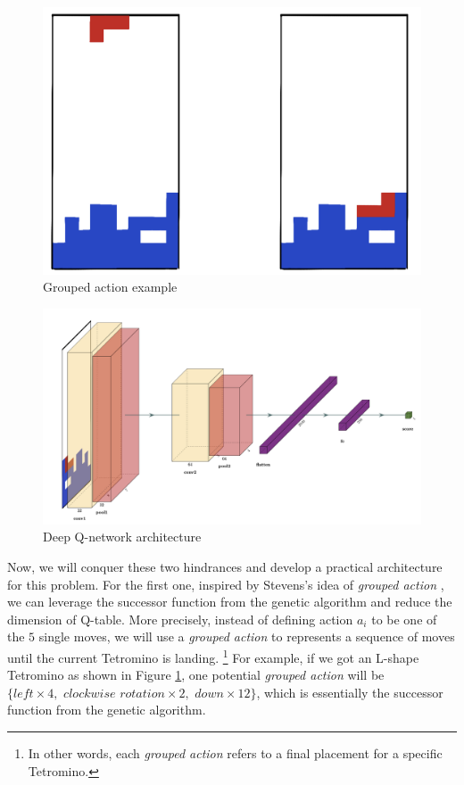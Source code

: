 \documentclass[letterpaper]{article} %
\begin{document}
\begin{figure}
  \centering
  \includegraphics[width=0.9\linewidth]{figures/group_actions.jpeg}
  \caption{Grouped action example}
  \label{fig:grouped_action}
\end{figure}


\begin{figure}[h]
  \centering
  \includegraphics[width=0.85\linewidth]{figures/DQN.png}
  \caption{Deep Q-network architecture}
  \label{fig:DQN}
\end{figure}

Now, we will conquer these two hindrances and develop a practical architecture for this problem. For the first one, inspired by Stevens's idea of \textit{grouped action} \cite{Stevens_2016}, we can leverage the successor function from the genetic algorithm and reduce the dimension of Q-table. More precisely, instead of defining action $a_i$ to be one of the $5$ single moves, we will use a \textit{grouped action} to represents a sequence of moves until the current Tetromino is landing. \footnote{In other words, each \textit{grouped action} refers to a final placement for a specific Tetromino.} For example, if we got an L-shape Tetromino as shown in Figure \ref{fig:grouped_action}, one potential \textit{grouped action} will be $\{left\times 4, \,\,clockwise\,\,rotation \times 2,\,\,down\times 12\}$, which is essentially the successor function from the genetic algorithm.
\end{document}
